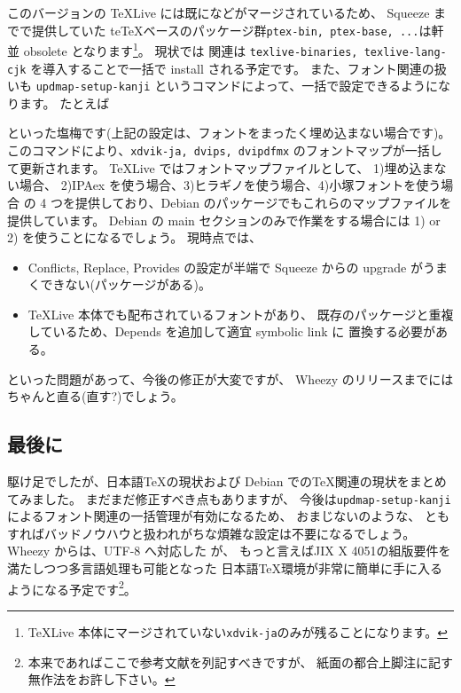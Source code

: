 \documentclass[mingoth,a4paper]{jsarticle}
\begin{document}
このバージョンの {\TeX}Live には既に\pTeX などがマージされているため、
Squeeze までで提供していた te\TeX ベースのパッケージ群{\tt{ptex-bin, ptex-base, ...}}は軒並 obsolete となります\footnote{%
  {\TeX}Live 本体にマージされていない{\tt{xdvik-ja}}のみが残ることになります。
}。
%
現状では \pTeX 関連は {\tt{texlive-binaries, texlive-lang-cjk}} を導入することで一括で install される予定です。
また、フォント関連の扱いも {\tt{updmap-setup-kanji}} というコマンドによって、一括で設定できるようになります。
%
たとえば
\noindent といった塩梅です(上記の設定は、フォントをまったく埋め込まない場合です)。
このコマンドにより、{\tt{xdvik-ja, dvips, dvipdfmx}} のフォントマップが一括して更新されます。
%
{\TeX}Live ではフォントマップファイルとして、
1)埋め込まない場合、 2)IPAex を使う場合、3)ヒラギノを使う場合、4)小塚フォントを使う場合
の 4 つを提供しており、Debian のパッケージでもこれらのマップファイルを提供しています。
Debian の main セクションのみで作業をする場合には 1) or 2) を使うことになるでしょう。
現時点では、
\begin{itemize}
\item Conflicts, Replace, Provides の設定が半端で
  Squeeze からの upgrade がうまくできない(パッケージがある)。
\item {\TeX}Live 本体でも配布されているフォントがあり、
  既存のパッケージと重複しているため、Depends を追加して適宜 symbolic link に
  置換する必要がある。
\end{itemize}
といった問題があって、今後の修正が大変ですが、
Wheezy のリリースまでにはちゃんと直る(直す?)でしょう。

\subsection{最後に}

駆け足でしたが、日本語{\TeX}の現状および
Debian での{\TeX}関連の現状をまとめてみました。
%
まだまだ修正すべき点もありますが、
今後は{\tt{updmap-setup-kanji}}によるフォント関連の一括管理が有効になるため、
おまじないのような、
ともすればバッドノウハウと扱われがちな煩雑な設定は不要になるでしょう。
%
Wheezy からは、UTF-8 へ対応した \pTeX が、
もっと言えばJIX X 4051の組版要件を満たしつつ多言語処理も可能となった
日本語{\TeX}環境が非常に簡単に手に入るようになる予定です\footnote{%
  本来であればここで参考文献を列記すべきですが、
  紙面の都合上脚注に記す無作法をお許し下さい。
}。
\end{document}
